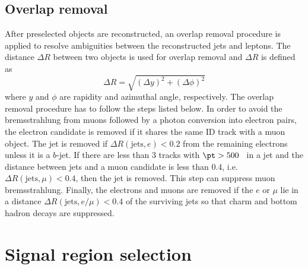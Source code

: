 
\subsection{Overlap removal}
\label{subsec:event_overlap_removal}
After preselected objects are reconstructed, an overlap removal procedure is applied to resolve ambiguities between the reconstructed jets and leptons.
The distance $\Delta R$ between two objects is used for overlap removal and $\Delta R$ is defined as
%
\begin{equation}
    \Delta R = \sqrt{(\Delta y)^{2} + (\Delta \phi)^{2}}
\end{equation}
%
where $y$ and $\phi$ are rapidity and azimuthal angle, respectively.
The overlap removal procedure has to follow the steps listed below.
In order to avoid the bremsstrahlung from muons followed by a photon conversion into electron pairs, the electron candidate is removed if it shares the same ID track with a muon object.
The jet is removed if $\Delta R(\mathrm{jets}, e) < 0.2$ from the remaining electrons unless it is a $b$-jet.
If there are less than 3 tracks with $\pt > 500$~{\MeV} in a jet and the distance between jets and a muon candidate is less than 0.4, i.e. $\Delta R(\mathrm{jets}, \mu) < 0.4$, then the jet is removed.
This step can suppress muon bremsstrahlung.
Finally, the electrons and muons are removed if the $e$ or $\mu$ lie in a distance $\Delta R(\mathrm{jets}, e/\mu) < 0.4$ of the surviving jets so that charm and bottom hadron decays are suppressed.


\section{Signal region selection}
\label{sec:event_signal_region_selection}


